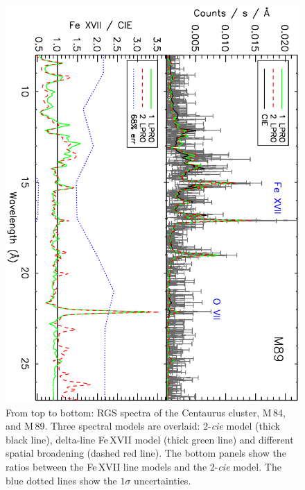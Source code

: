 \documentclass[useAMS,usenatbib]{mn2e}
\begin{document}
\begin{figure}
  \includegraphics[width=0.7\columnwidth, angle=90]{paper_ovii_fig01c.ps}
   \caption{From top to bottom: RGS spectra of the Centaurus cluster,
   M\,84, and M\,89. Three spectral models are overlaid:
   2-\textit{cie} model (thick black line), delta-line Fe\,{\small XVII} model
   (thick green line) and different spatial broadening (dashed red line).
   The bottom panels show the ratios between the Fe\,{\small XVII} line models
   and the 2-\textit{cie} model. The blue dotted lines show the $1\sigma$
   uncertainties.} \label{Fig:Spectra_ratios}
\end{figure}
\end{document}
